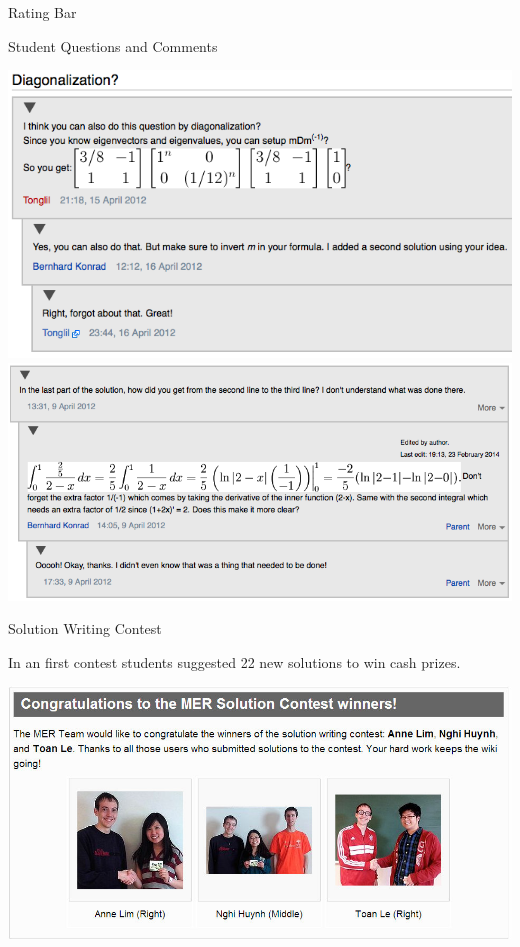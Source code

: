 \documentclass[final]{beamer}
\newlength{\onecolwid}
\begin{document}
\begin{frame}[t]
\begin{columns}[t]
\begin{column}{\onecolwid}
\begin{block}{Rating Bar}
\end{block}


\begin{block}{Student Questions and Comments}

\begin{center}
\includegraphics[width=.4\textwidth]{diagonalization.png} \includegraphics[width=.4\textwidth]{CommentQuestion3.png}
\end{center}

\end{block}

\vspace{-1.5cm}

\begin{block}{Solution Writing Contest}

In an first contest students suggested 22 new solutions to win cash prizes.

\begin{center}
\includegraphics[width=.55\textwidth]{contest_winners.jpg}
\end{center}

\end{block}




\end{column}
\end{columns}
\end{frame}
\end{document}
